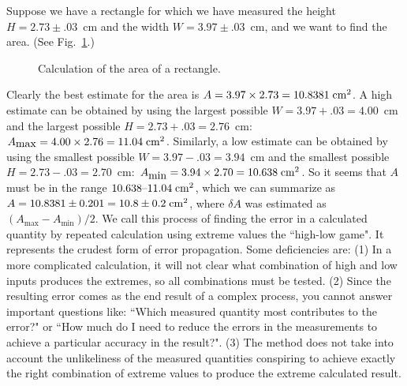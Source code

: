 Suppose we have a rectangle
for which we have measured the height $H=2.73\pm .03$~cm and the 
width $W=3.97\pm.03$~cm, and we
want to find the area.  (See Fig.~\ref{fig:rect}.)
\begin{figure}[hbt]
\begin{center}
{}
\end{center}
 \caption{Calculation of the area of a rectangle.  \label{fig:rect}}
\end{figure}
Clearly the best estimate for the area is $A=3.97\times2.73=10.8381\;{\rm cm^2}$.
A high estimate can be obtained by using the largest possible $W=3.97+.03=4.00$~cm
and the largest possible  $H=2.73+.03=2.76$~cm: 
$A_{\mbox{max}}=4.00\times2.76=11.04\;{\rm cm^2}$. Similarly,
a low estimate can be obtained by using the smallest possible $W=3.97-.03=3.94$~cm
and the smallest possible  $H=2.73-.03=2.70$~cm: 
$A_{\mbox{min}}=3.94\times2.70=10.638\;{\rm cm^2}$. So it seems that
$A$ must be in the range $10.638\mbox{--}11.04\;{\rm cm^2}$, which we can summarize as
$A=10.8381\pm 0.201 = 10.8\pm 0.2\;{\rm cm^2}$, where $\delta A$ was estimated
as $(A_{\mbox{max}}-A_{\mbox{min}})/2$.  We call this process of finding the
error in a calculated quantity by repeated calculation using extreme values
the ``high-low game".  It represents the crudest form of error propagation.
Some deficiencies are: (1) In a more complicated calculation, it will not clear what combination
of high and low inputs produces the extremes, so all combinations must be tested.
(2) Since the resulting error comes as the end result of a complex process, you cannot
answer important questions like: ``Which measured quantity most contributes
to the error?" or ``How much do I need to reduce the errors in the measurements to
achieve a particular accuracy in the result?".  (3) The method does not take into
account the unlikeliness of the measured quantities conspiring to achieve exactly the
right combination of extreme values to produce the extreme calculated result.


